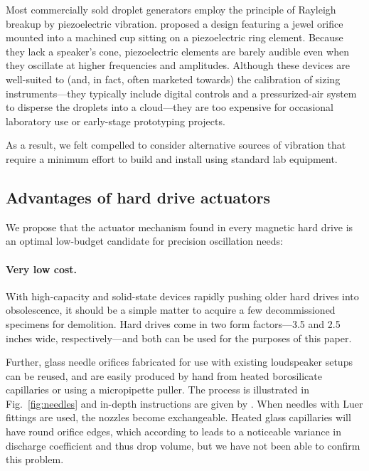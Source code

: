 \documentclass[11.5pt,oneside]{book}
\newcommand*{\figref}[1]{Fig.~\ref{#1}}
\begin{document}
Most commercially sold droplet generators employ the principle of Rayleigh breakup by
piezoelectric vibration. \citet{Berglund73} proposed a design featuring a jewel
orifice mounted into a machined cup sitting on a piezoelectric ring element.
Because they lack a speaker's cone, piezoelectric elements are barely audible
even when they oscillate at higher frequencies and amplitudes. Although these
devices are well-suited to (and, in fact, often marketed towards) the
calibration of sizing instruments—they typically include digital controls and a
pressurized-air system to disperse the droplets into a cloud—they are too
expensive for occasional laboratory use or early-stage prototyping projects.

As a result, we felt compelled to
consider alternative sources of vibration that require a minimum effort to build
and install using standard lab equipment.

\subsection{Advantages of hard drive actuators}
We propose that the actuator mechanism
found in every magnetic hard drive is an optimal low-budget candidate for
precision oscillation needs:

\paragraph*{Very low cost.} With high-capacity and solid-state devices rapidly pushing older hard drives
into obsolescence, it should be a simple matter to acquire a few decommissioned specimens for
demolition. Hard drives come in two form factors---3.5 and 2.5 inches wide,
respectively---and both can be used for the purposes of this paper. 

Further, glass needle orifices fabricated for use with existing loudspeaker setups can be
reused, and are easily produced by hand from heated borosilicate capillaries or
using a micropipette puller. The process is illustrated in \figref{fig:needles}
and in-depth instructions are given by \citet{Lee02}. When needles with Luer
fittings are used, the nozzles become exchangeable. Heated glass capillaries
will have round orifice edges, which according to
\citet{Dressler90} leads to a noticeable variance in discharge coefficient and
thus drop volume, but we have not been able to confirm this problem.
\end{document}
